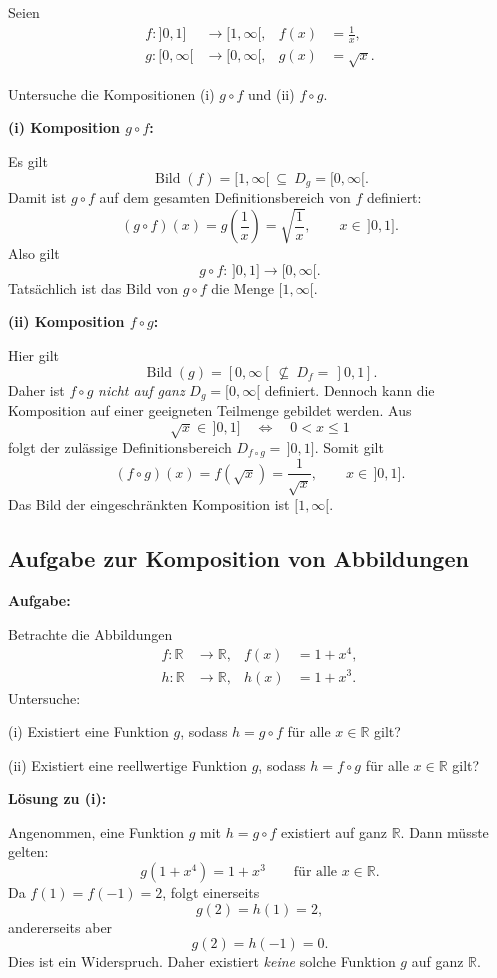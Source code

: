 Seien
\[
\begin{aligned}
f:]0,1]&\rightarrow[1,\infty[,
& f(x)&=\frac1x,\\
g:[0,\infty[&\rightarrow[0,\infty[,
& g(x)&=\sqrt{x}.
\end{aligned}
\]

Untersuche die Kompositionen (i) $g\circ f$ und (ii) $f\circ g$.

\textbf{(i) Komposition $g\circ f$:}

Es gilt
\[
\operatorname{Bild}(f)=[1,\infty[\ \subseteq\ D_g=[0,\infty[.
\]
Damit ist $g\circ f$ auf dem gesamten Definitionsbereich
von $f$ definiert:
\[
\boxed{
(g\circ f)(x)=g\!\left(\frac1x\right)=\sqrt{\frac1x},
\qquad x\in\,]0,1].
}
\]
Also gilt
\[
g\circ f:\,]0,1]\rightarrow[0,\infty[.
\]
Tatsächlich ist das Bild von $g\circ f$ die Menge $[1,\infty[$.

\textbf{(ii) Komposition $f\circ g$:}

Hier gilt
\[
\operatorname{Bild}(g)=[0,\infty[\ \nsubseteq\ D_f=\,]0,1].
\]
Daher ist $f\circ g$ \emph{nicht auf ganz} $D_g=[0,\infty[$
definiert. Dennoch kann die Komposition auf einer geeigneten
Teilmenge gebildet werden. Aus
\[
\sqrt{x}\in\,]0,1]
\quad\Longleftrightarrow\quad
0<x\leq1
\]
folgt der zulässige Definitionsbereich $D_{f\circ g}=\,]0,1]$.
Somit gilt
\[
\boxed{
(f\circ g)(x)=f(\sqrt{x})=\frac1{\sqrt{x}},
\qquad x\in\,]0,1].
}
\]
Das Bild der eingeschränkten Komposition ist $[1,\infty[$.

\subsection{Aufgabe zur Komposition von Abbildungen}

\textbf{Aufgabe:}

Betrachte die Abbildungen
\[
\begin{aligned}
f:\mathbb R&\rightarrow\mathbb R,
&f(x)&=1+x^4,\\
h:\mathbb R&\rightarrow\mathbb R,
&h(x)&=1+x^3.
\end{aligned}
\]
Untersuche:

(i) Existiert eine Funktion $g$, sodass $h=g\circ f$
für alle $x\in\mathbb R$ gilt?

(ii) Existiert eine reellwertige Funktion $g$, sodass
$h=f\circ g$ für alle $x\in\mathbb R$ gilt?

\textbf{Lösung zu (i):}

Angenommen, eine Funktion $g$ mit $h=g\circ f$
existiert auf ganz $\mathbb R$. Dann müsste gelten:
\[
g(1+x^4)=1+x^3
\qquad\text{für alle }x\in\mathbb R.
\]
Da $f(1)=f(-1)=2$, folgt einerseits
\[
g(2)=h(1)=2,
\]
andererseits aber
\[
g(2)=h(-1)=0.
\]
Dies ist ein Widerspruch. Daher existiert \emph{keine}
solche Funktion $g$ auf ganz $\mathbb R$.

